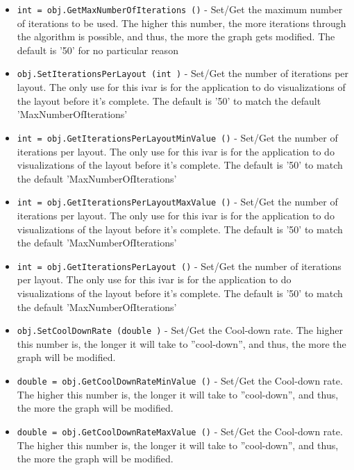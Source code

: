 \begin{itemize}
\item  \verb|int = obj.GetMaxNumberOfIterations ()| -  Set/Get the maximum number of iterations to be used.
 The higher this number, the more iterations through the algorithm
 is possible, and thus, the more the graph gets modified.
 The default is '50' for no particular reason

\item  \verb|obj.SetIterationsPerLayout (int )| -  Set/Get the number of iterations per layout.
 The only use for this ivar is for the application
 to do visualizations of the layout before it's complete.
 The default is '50' to match the default 'MaxNumberOfIterations'

\item  \verb|int = obj.GetIterationsPerLayoutMinValue ()| -  Set/Get the number of iterations per layout.
 The only use for this ivar is for the application
 to do visualizations of the layout before it's complete.
 The default is '50' to match the default 'MaxNumberOfIterations'

\item  \verb|int = obj.GetIterationsPerLayoutMaxValue ()| -  Set/Get the number of iterations per layout.
 The only use for this ivar is for the application
 to do visualizations of the layout before it's complete.
 The default is '50' to match the default 'MaxNumberOfIterations'

\item  \verb|int = obj.GetIterationsPerLayout ()| -  Set/Get the number of iterations per layout.
 The only use for this ivar is for the application
 to do visualizations of the layout before it's complete.
 The default is '50' to match the default 'MaxNumberOfIterations'

\item  \verb|obj.SetCoolDownRate (double )| -  Set/Get the Cool-down rate.
 The higher this number is, the longer it will take to ''cool-down'',
 and thus, the more the graph will be modified.

\item  \verb|double = obj.GetCoolDownRateMinValue ()| -  Set/Get the Cool-down rate.
 The higher this number is, the longer it will take to ''cool-down'',
 and thus, the more the graph will be modified.

\item  \verb|double = obj.GetCoolDownRateMaxValue ()| -  Set/Get the Cool-down rate.
 The higher this number is, the longer it will take to ''cool-down'',
 and thus, the more the graph will be modified.


\end{itemize}
